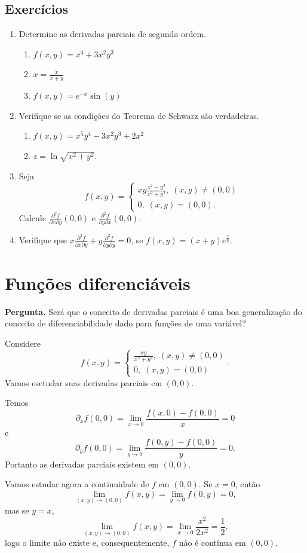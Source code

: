 \subsection{Exercícios}

\begin{enumerate}
    \item Determine as derivadas parciais de segunda ordem.
        \begin{enumerate}
            \item \(f(x,y) = x^4 + 3x^2y^3\)
            \item \(x = \frac{x}{x+y}\)
            \item \(f(x,y) = e^{-x} \sin(y)\)
        \end{enumerate}
    \item Verifique se as condições do Teorema de Schwarz são verdadeiras.
        \begin{enumerate}
            \item \(f(x,y) = x^5y^4 - 3x^2y^3 + 2x^2\)
            \item \(z = \ln\sqrt{x^2 + y^2}\).
        \end{enumerate}
    \item Seja \[f(x,y) = \begin{cases}
        xy\frac{x^2 - y^2}{x^2 + y^2},\; (x,y)\neq(0,0) \\
        0,\; (x,y)=(0,0).
    \end{cases}\] Calcule \(\frac{\partial^2 f}{\partial x \partial y}(0,0)\) e \(\frac{\partial^2 f}{\partial y \partial x}(0,0)\).
    \item Verifique que \(x \frac{\partial^2 f}{\partial x \partial y} + y \frac{\partial^2 f}{\partial y \partial y} = 0 \), se \(f(x,y) = (x+y)e^{\frac{x}{y}}\).
\end{enumerate}

\section{Funções diferenciáveis}

\textbf{Pergunta. } Será que o conceito de derivadas parciais é uma boa generalização do conceito de diferenciabilidade dado para funções de uma variável?

\begin{example}
    Considere \[f(x,y) = \begin{cases}
        \frac{xy}{x^2 + y^2},\; (x,y)\neq(0,0) \\
        0,\; (x,y)=(0,0)
    \end{cases}.\] Vamos esetudar suas derivadas parciais em \((0,0)\).

    Temos \[\partial_x f(0,0) = \lim_{x\to 0} \frac{f(x,0) - f(0,0)}{x} = 0\] e \[ \partial_y f(0,0) = \lim_{y\to 0}\frac{f(0,y)-f(0,0)}{y} = 0.\] Portanto as derivadas parciais existem em \((0,0)\).

    Vamos estudar agora a continuidade de \(f\) em \((0,0)\). Se \(x=0\), então \[\lim_{(x,y)\to(0,0)} f(x,y) = \lim_{y\to 0} f(0,y) = 0,\] mas se \(y=x\), \[\lim_{(x,y)\to(0,0)} f(x,y) = \lim_{x\to 0} \frac{x^2}{2x^2} = \frac{1}{2},\] logo o limite não existe e, consequentemente, \(f\) não é contínua em \((0,0)\).
\end{example}

